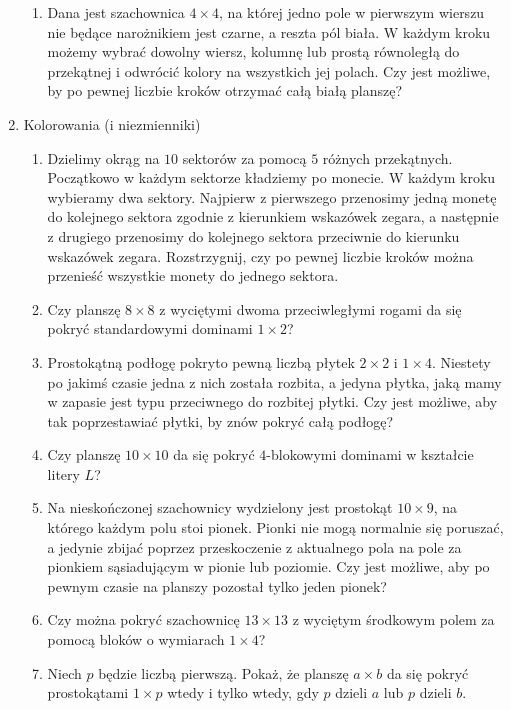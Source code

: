 \documentclass{article}
\begin{document}
\begin{enumerate}[\Roman*.]
\begin{enumerate}[1.]
				\item Dana jest szachownica $4 \times 4$, na której jedno pole w pierwszym wierszu nie będące narożnikiem jest czarne, a reszta pól biała. W każdym kroku możemy wybrać dowolny wiersz, kolumnę lub prostą równoległą do przekątnej i odwrócić kolory na wszystkich jej polach. Czy jest możliwe, by po pewnej liczbie kroków otrzymać całą białą planszę?
			\end{enumerate}
			\pagebreak
			\item Kolorowania (i niezmienniki)
			
			\begin{enumerate}[1.]
				\item Dzielimy okrąg na $10$ sektorów za pomocą $5$ różnych przekątnych. Początkowo w każdym sektorze kładziemy po monecie. W każdym kroku wybieramy dwa sektory. Najpierw z pierwszego przenosimy jedną monetę do kolejnego sektora zgodnie z kierunkiem wskazówek zegara, a następnie z drugiego przenosimy do kolejnego sektora przeciwnie do kierunku wskazówek zegara. Rozstrzygnij, czy po pewnej liczbie kroków można przenieść wszystkie monety do jednego sektora.
						
				\item Czy planszę $8 \times 8$ z wyciętymi dwoma przeciwległymi rogami da się pokryć standardowymi dominami $1 \times 2$?
				
				\item Prostokątną podłogę pokryto pewną liczbą płytek $2 \times 2$ i $1 \times 4$. Niestety po jakimś czasie jedna z nich została rozbita, a jedyna płytka, jaką mamy w zapasie jest typu przeciwnego do rozbitej płytki. Czy jest możliwe, aby tak poprzestawiać płytki, by znów pokryć całą podłogę?

				\item Czy planszę $10 \times 10$ da się pokryć $4$-blokowymi dominami w kształcie litery $L$?

				\item Na nieskończonej szachownicy wydzielony jest prostokąt $10 \times 9$, na którego każdym polu stoi pionek. Pionki nie mogą normalnie się poruszać, a jedynie zbijać poprzez przeskoczenie z aktualnego pola na pole za pionkiem sąsiadującym w pionie lub poziomie. Czy jest możliwe, aby po pewnym czasie na planszy pozostał tylko jeden pionek?
				
				\item Czy można pokryć szachownicę $13 \times 13$ z wyciętym środkowym polem za pomocą bloków o wymiarach $1 \times 4$?
				
				\item Niech $p$ będzie liczbą pierwszą. Pokaż, że planszę $a \times b$ da się pokryć prostokątami $1 \times p$ wtedy i tylko wtedy, gdy $p$ dzieli $a$ lub $p$ dzieli $b$.

			\end{enumerate}
		\end{enumerate}
\end{document}
